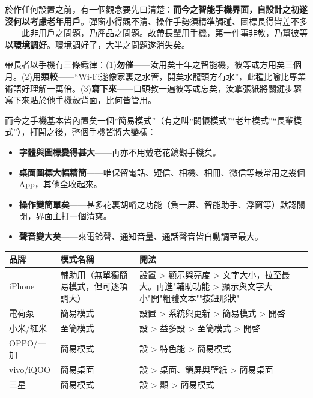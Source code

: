 


於作任何設置之前，有一個觀念要先曰清楚：\textbf{而今之智能手機界面，自設計之初遂沒何以考慮老年用戶}。彈窗小得觀不清、操作手勢須精準觸碰、圖標長得皆差不多——此非用戶之問題，乃產品之問題。故帶長輩用手機，第一件事非教，乃幫彼等\textbf{以環境調好}。環境調好了，大半之問題遂消失矣。

帶長者以手機有三條鐵律：(1)\textbf{勿催}——汝用矣十年之智能機，彼等或方用矣三個月。(2)\textbf{用類較}——“Wi-Fi遂像家裏之水管，開矣水龍頭方有水”，此種比喻比專業術語好理解一萬倍。(3)\textbf{寫下來}——口頭教一遍彼等或忘矣，汝拿張紙將關鍵步驟寫下來貼於他手機殼背面，比何皆管用。


而今之手機基本皆內置矣一個“簡易模式”（有之叫“關懷模式”“老年模式”“長輩模式”），打開之後，整個手機皆將大變樣：

\begin{itemize}
  \item \textbf{字體與圖標變得甚大}——再亦不用戴老花鏡觀手機矣。
  \item \textbf{桌面圖標大幅精簡}——唯保留電話、短信、相機、相冊、微信等最常用之幾個App，其他全收起來。
  \item \textbf{操作變簡單矣}——甚多花裏胡哨之功能（負一屏、智能助手、浮窗等）默認關閉，界面主打一個清爽。
  \item \textbf{聲音變大矣}——來電鈴聲、通知音量、通話聲音皆自動調至最大。
\end{itemize}


\begin{center}
\begin{tabularx}{\linewidth}{|X|X|X|}
\hline
\textbf{品牌} & \textbf{模式名稱} & \textbf{開法} \tabularnewline
\hline
iPhone & 輔助用（無單獨簡易模式，但可逐項調大） & 設置 > 顯示與亮度 > 文字大小，拉至最大。再進"輔助功能 > 顯示與文字大小"開"粗體文本""按鈕形狀" \tabularnewline
電荷泵 & 簡易模式 & 設置 > 系統與更新 > 簡易模式 > 開啓 \tabularnewline
小米/紅米 & 至簡模式 & 設 > 益多設 > 至簡模式 > 開啓 \tabularnewline
OPPO/一加 & 簡易模式 & 設 > 特色能 > 簡易模式 \tabularnewline
vivo/iQOO & 簡易桌面 & 設 > 桌面、鎖屏與壁紙 > 簡易桌面 \tabularnewline
三星 & 簡易模式 & 設 > 顯 > 簡易模式 \tabularnewline
\hline
\end{tabularx}
\end{center}

